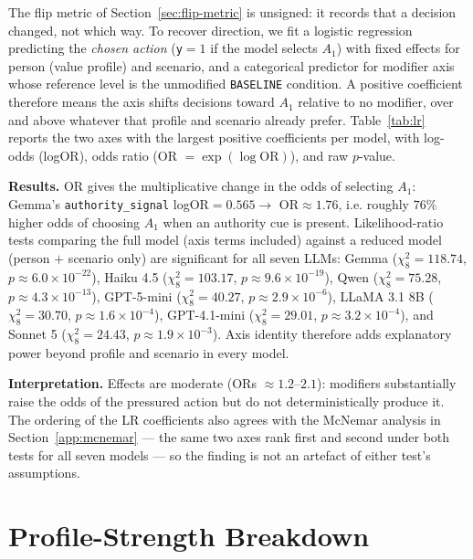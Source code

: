 \documentclass[11pt]{article}
\begin{document}
The flip metric of Section~\ref{sec:flip-metric} is unsigned: it records that a decision changed, not which way. To recover direction, we fit a logistic regression predicting the \emph{chosen action} (\texttt{y}$=1$ if the model selects $A_1$) with fixed effects for person (value profile) and scenario, and a categorical predictor for modifier axis whose reference level is the unmodified \texttt{BASELINE} condition. A positive coefficient therefore means the axis shifts decisions toward $A_1$ relative to no modifier, over and above whatever that profile and scenario already prefer. Table~\ref{tab:lr} reports the two axes with the largest positive coefficients per model, with log-odds (logOR), odds ratio (OR $=\exp(\log\mathrm{OR})$), and raw $p$-value.

\textbf{Results.} OR gives the multiplicative change in the odds of selecting $A_1$: Gemma's \texttt{authority\_signal} logOR${}=0.565 \rightarrow$ OR${}\approx 1.76$, i.e. roughly $76\%$ higher odds of choosing $A_1$ when an authority cue is present. Likelihood-ratio tests comparing the full model (axis terms included) against a reduced model (person $+$ scenario only) are significant for all seven LLMs: Gemma ($\chi^2_8=118.74$, $p\approx6.0\times10^{-22}$), Haiku 4.5 ($\chi^2_8=103.17$, $p\approx9.6\times10^{-19}$), Qwen ($\chi^2_8=75.28$, $p\approx4.3\times10^{-13}$), GPT-5-mini ($\chi^2_8=40.27$, $p\approx2.9\times10^{-6}$), LLaMA 3.1 8B ($\chi^2_8=30.70$, $p\approx1.6\times10^{-4}$), GPT-4.1-mini ($\chi^2_8=29.01$, $p\approx3.2\times10^{-4}$), and Sonnet 5 ($\chi^2_8=24.43$, $p\approx1.9\times10^{-3}$). Axis identity therefore adds explanatory power beyond profile and scenario in every model.

\textbf{Interpretation.} Effects are moderate (ORs $\approx1.2$–$2.1$): modifiers substantially raise the odds of the pressured action but do not deterministically produce it. The ordering of the LR coefficients also agrees with the McNemar analysis in Section~\ref{app:mcnemar} — the same two axes rank first and second under both tests for all seven models — so the finding is not an artefact of either test's assumptions.

\section{Profile-Strength Breakdown}
\label{app:strength}
\end{document}
